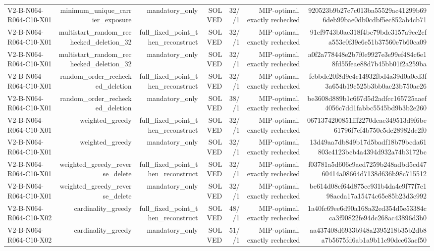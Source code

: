 {\begin{longtable}{lrrrrrr}
V2-B-N064-R064-C10-X01 & minimum\_unique\_carrier\_exposure & mandatory\_only & SOLVED & 32//1 & MIP-optimal, exactly rechecked & 920523b9b27c7c013ba55529ac41299b696deb99bae0db0cdbf5ec852ab4cb71 \\
V2-B-N064-R064-C10-X01 & multistart\_random\_rechecked\_deletion\_32 & full\_fixed\_point\_then\_reconstruct & SOLVED & 32//1 & MIP-optimal, exactly rechecked & 91ef9743b0ac318f4bc79bdc3157a9cc2cfa553e0f39e6e51b37560e7b60ca09 \\
V2-B-N064-R064-C10-X01 & multistart\_random\_rechecked\_deletion\_32 & mandatory\_only & SOLVED & 32//1 & MIP-optimal, exactly rechecked & a0f2a778448e2b7f0e9927e3e99ef484c6e18fd55feae88d7b45bb01f2a259ba \\
V2-B-N064-R064-C10-X01 & random\_order\_rechecked\_deletion & full\_fixed\_point\_then\_reconstruct & SOLVED & 32//1 & MIP-optimal, exactly rechecked & fcbbde20f8d9e4c14932fbd4a39d0a0ed3f3a654b19c525b3bb0ac23b750ae26 \\
V2-B-N064-R064-C10-X01 & random\_order\_rechecked\_deletion & mandatory\_only & SOLVED & 38//1 & MIP-optimal, exactly rechecked & be3608d889b1c667d5d2adfcc165725aaef4056c7dd1fabbc5545bd9b3b2e260 \\
V2-B-N064-R064-C10-X01 & weighted\_greedy & full\_fixed\_point\_then\_reconstruct & SOLVED & 32//1 & MIP-optimal, exactly rechecked & 0671374200851fff2270deae349513d9f6be61796f7cf4b750c5de28982de2f0 \\
V2-B-N064-R064-C10-X01 & weighted\_greedy & mandatory\_only & SOLVED & 32//1 & MIP-optimal, exactly rechecked & 13d49aa7db849b17d5badf18b79bcda61803c4123bcb4a4394d932a74b3172bc \\
V2-B-N064-R064-C10-X01 & weighted\_greedy\_reverse\_delete & full\_fixed\_point\_then\_reconstruct & SOLVED & 32//1 & MIP-optimal, exactly rechecked & f03781a5d606c9aed7259b248adbd5cd4760414a08664d7138d636b98c715512 \\
V2-B-N064-R064-C10-X01 & weighted\_greedy\_reverse\_delete & mandatory\_only & SOLVED & 32//1 & MIP-optimal, exactly rechecked & be614d08cf64d875ce931b4da4e9f77f7e198acda17a15474c65e85b23d3c992 \\
V2-B-N064-R064-C10-X02 & cardinality\_greedy & full\_fixed\_point\_then\_reconstruct & SOLVED & 48//1 & MIP-optimal, exactly rechecked & 1a40fc69ee6d90a168a32ed354d5e53384cca3f90822fe94dc268ac43896d3b0 \\
V2-B-N064-R064-C10-X02 & cardinality\_greedy & mandatory\_only & SOLVED & 51//1 & MIP-optimal, exactly rechecked & aa437408d6933b948a2395218b35b2db8a7b5675fd6ab1a9b11c90dcc63acf50 \\

\end{longtable}}
